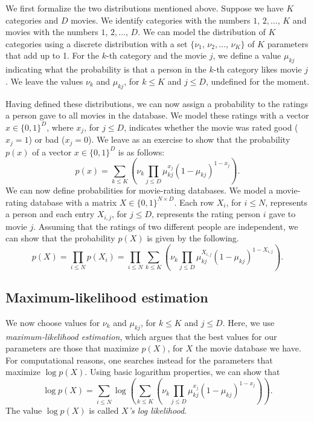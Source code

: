 We first formalize the two distributions mentioned above. Suppose we have $K$ categories and $D$ movies. We identify categories with the numbers $1$, $2, \ldots$, $K$ and movies with the numbers $1$, $2, \ldots$, $D$. We can model the distribution of $K$ categories using a discrete distribution with a set $\{\nu_1$, $\nu_2, \ldots$, $\nu_{K}\}$ of $K$ parameters that add up to 1. For the $k$-th category and the movie $j$, we define a value $\mu_{kj}$ indicating what the probability is that a person in the $k$-th category likes movie $j$. We leave the values $\nu_k$ and $\mu_{kj}$, for $k \leq K$ and $j \leq D$, undefined for the moment.

Having defined these distributions, we can now assign a probability to the ratings a person gave to all movies in the database. We model these ratings with a vector $x \in \{0, 1\}^D$, where $x_j$, for $j \leq D$, indicates whether the movie was rated good ($x_j = 1$) or bad ($x_j = 0$). We leave as an exercise to show that the probability $p(x)$ of a vector $x \in \{0, 1\}^D$ is as follows:
%
\begin{equation}
p(x) = \sum_{k \leq K} \left(\nu_k \prod_{j \leq D} \mu_{kj}^{x_j}\left(1 - \mu_{kj}\right)^{1 - x_j}\right).
\label{eq:individual_likelihood}
\end{equation}
%
We can now define probabilities for movie-rating databases. We model a movie-rating database with a matrix $X \in \{0, 1\}^{N \times D}$. Each row $X_i$, for $i \leq N$, represents a person and each entry $X_{i,j}$, for $j \leq D$, represents the rating person $i$ gave to movie $j$. Assuming that the ratings of two different people are independent, we can show that the probability $p(X)$ is given by the following.
%
\begin{equation}
p(X) = \prod_{i \leq N} p(X_i) = \prod_{i \leq N} \sum_{k \leq K} \left(\nu_k \prod_{j \leq D} \mu_{kj}^{X_{i,j}}\left(1 - \mu_{kj}\right)^{1 - X_{i,j}}\right).
\label{eq:incomplete_likelihood}
\end{equation}
%

\subsection{Maximum-likelihood estimation}

We now choose values for $\nu_k$ and $\mu_{kj}$, for $k \leq K$ and $j \leq D$. Here, we use \emph{maximum-likelihood estimation}, which argues that the best values for our parameters are those that maximize $p(X)$, for $X$ the movie database we have. For computational reasons, one searches instead for the parameters that maximize $\log p(X)$. Using basic logarithm properties, we can show that
%
%
\begin{equation}
\log p(X) = \sum_{i \leq N} \log \left(\sum_{k \leq K} \left(\nu_k \prod_{j \leq D} \mu_{kj}^{x_j}\left(1 - \mu_{kj}\right)^{1 - x_j}\right)\right).
\label{eq:log_incomplete_likelihood}
\end{equation}
%
%
The value $\log p(X)$ is called \emph{$X$'s log likelihood}. 

